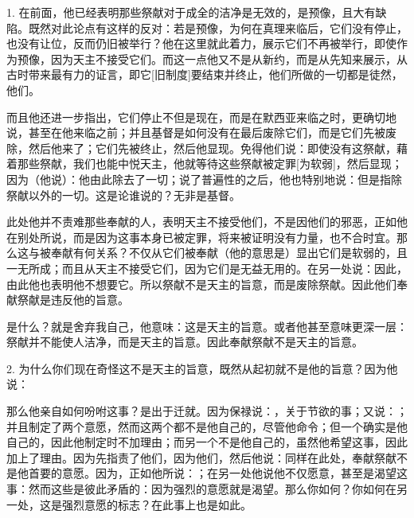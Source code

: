 1. 在前面，他已经表明那些祭献对于成全的洁净是无效的，是预像，且大有缺陷。既然对此论点有这样的反对：若是预像，为何在真理来临后，它们没有停止，也没有让位，反而仍旧被举行？他在这里就此着力，展示它们不再被举行，即使作为预像，因为天主不接受它们。而这一点他又不是从新约，而是从先知来展示，从古时带来最有力的证言，即它[旧制度]要结束并终止，他们所做的一切都是徒然，他们。\par

而且他还进一步指出，它们停止不但是现在，而是在默西亚来临之时，更确切地说，甚至在他来临之前；并且基督是如何没有在最后废除它们，而是它们先被废除，然后他来了；它们先被终止，然后他显现。免得他们说：即使没有这祭献，藉着那些祭献，我们也能中悦天主，他就等待这些祭献被定罪[为软弱]，然后显现；因为（他说）：他由此除去了一切；说了普遍性的之后，他也特别地说：但是指除祭献以外的一切。这是论谁说的？无非是基督。\par

此处他并不责难那些奉献的人，表明天主不接受他们，不是因他们的邪恶，正如他在别处所说，而是因为这事本身已被定罪，将来被证明没有力量，也不合时宜。那么这与被奉献有何关系？不仅从它们被奉献（他的意思是）显出它们是软弱的，且一无所成；而且从天主不接受它们，因为它们是无益无用的。在另一处说：因此，由此他也表明他不想要它。所以祭献不是天主的旨意，而是废除祭献。因此他们奉献祭献是违反他的旨意。\par

是什么？就是舍弃我自己，他意味：这是天主的旨意。或者他甚至意味更深一层：祭献并不能使人洁净，而是天主的旨意。因此奉献祭献不是天主的旨意。\par

2. 为什么你们现在奇怪这不是天主的旨意，既然从起初就不是他的旨意？因为他说：\par

那么他亲自如何吩咐这事？是出于迁就。因为保禄说：，关于节欲的事；又说：；并且制定了两个意愿，然而这两个都不是他自己的，尽管他命令；但一个确实是他自己的，因此他制定时不加理由；而另一个不是他自己的，虽然他希望这事，因此加上了理由。因为先指责了他们，因为他们，然后他说：同样在此处，奉献祭献不是他首要的意愿。因为，正如他所说：；在另一处他说他不仅愿意，甚至是渴望这事：然而这些是彼此矛盾的：因为强烈的意愿就是渴望。那么你如何？你如何在另一处，这是强烈意愿的标志？在此事上也是如此。\par


